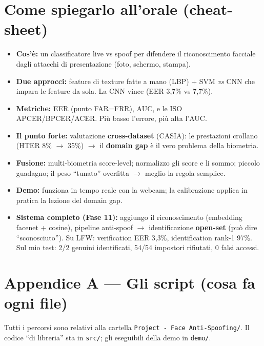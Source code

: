\documentclass[11pt,a4paper]{article}
\newcommand{\say}[1]{``#1''}
\begin{document}
\section{Come spiegarlo all'orale (cheat-sheet)}
\begin{itemize}
  \item \textbf{Cos'\`e:} un classificatore live vs spoof per difendere il riconoscimento
        facciale dagli attacchi di presentazione (foto, schermo, stampa).
  \item \textbf{Due approcci:} feature di texture fatte a mano (LBP) + SVM \emph{vs} CNN che
        impara le feature da sola. La CNN vince (EER 3,7\% vs 7,7\%).
  \item \textbf{Metriche:} EER (punto FAR=FRR), AUC, e le ISO APCER/BPCER/ACER. Pi\`u basso
        l'errore, pi\`u alta l'AUC.
  \item \textbf{Il punto forte:} valutazione \textbf{cross-dataset} (CASIA): le prestazioni
        crollano (HTER 8\% $\rightarrow$ 35\%) $\rightarrow$ il \textbf{domain gap} \`e il vero
        problema della biometria.
  \item \textbf{Fusione:} multi-biometria score-level; normalizzo gli score e li sommo; piccolo
        guadagno; il peso \say{tunato} overfitta $\rightarrow$ meglio la regola semplice.
  \item \textbf{Demo:} funziona in tempo reale con la webcam; la calibrazione applica in pratica
        la lezione del domain gap.
  \item \textbf{Sistema completo (Fase 11):} aggiungo il riconoscimento (embedding facenet +
        cosine), pipeline anti-spoof $\rightarrow$ identificazione \textbf{open-set} (pu\`o dire
        \say{sconosciuto}). Su LFW: verification EER 3,3\%, identification rank-1 97\%. Sul mio
        test: 2/2 genuini identificati, 54/54 impostori rifiutati, 0 falsi accessi.
\end{itemize}

\appendix
\section{Appendice A --- Gli script (cosa fa ogni file)}
Tutti i percorsi sono relativi alla cartella \texttt{Project - Face Anti-Spoofing/}.
Il codice \say{di libreria} sta in \texttt{src/}; gli eseguibili della demo in \texttt{demo/}.
\end{document}
